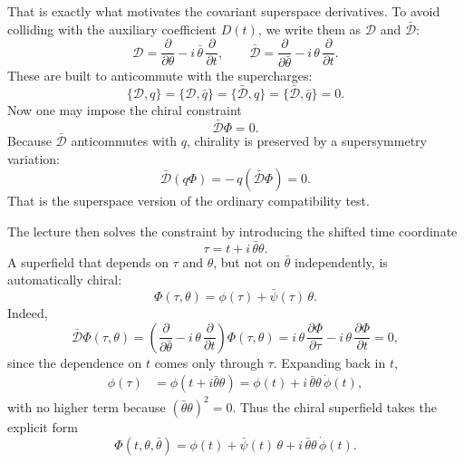 That is exactly what motivates the covariant superspace derivatives. To avoid colliding with the auxiliary coefficient \(D(t)\), we write them as \(\mathcal D\) and \(\bar{\mathcal D}\):
\begin{equation}
\mathcal D=\frac{\partial}{\partial\theta}-i\,\bar\theta\,\frac{\partial}{\partial t},
\qquad
\bar{\mathcal D}=\frac{\partial}{\partial\bar\theta}-i\,\theta\,\frac{\partial}{\partial t}.
\end{equation}
These are built to anticommute with the supercharges:
\begin{equation}
\{\mathcal D,q\}=\{\mathcal D,\bar q\}=\{\bar{\mathcal D},q\}=\{\bar{\mathcal D},\bar q\}=0.
\end{equation}
Now one may impose the chiral constraint
\begin{equation}
\bar{\mathcal D}\Phi=0.
\end{equation}
Because \(\bar{\mathcal D}\) anticommutes with \(q\), chirality is preserved by a supersymmetry variation:
\begin{equation}
\bar{\mathcal D}(q\Phi)=-\,q(\bar{\mathcal D}\Phi)=0.
\end{equation}
That is the superspace version of the ordinary compatibility test.

The lecture then solves the constraint by introducing the shifted time coordinate
\begin{equation}
\tau=t+i\,\bar\theta\theta.
\end{equation}
A superfield that depends on \(\tau\) and \(\theta\), but not on \(\bar\theta\) independently, is automatically chiral:
\begin{equation}
\Phi(\tau,\theta)=\phi(\tau)+\bar\psi(\tau)\,\theta.
\end{equation}
Indeed,
\begin{equation}
\bar{\mathcal D}\Phi(\tau,\theta)
=
\left(\frac{\partial}{\partial\bar\theta}-i\,\theta\,\frac{\partial}{\partial t}\right)\Phi(\tau,\theta)
=
i\,\theta\,\frac{\partial\Phi}{\partial\tau}
-
i\,\theta\,\frac{\partial\Phi}{\partial t}
=0,
\end{equation}
since the dependence on \(t\) comes only through \(\tau\). Expanding back in \(t\),
\begin{align}
\phi(\tau)
&=
\phi\!\left(t+i\bar\theta\theta\right)
=
\phi(t)+i\,\bar\theta\theta\,\dot\phi(t),
\end{align}
with no higher term because \((\bar\theta\theta)^2=0\). Thus the chiral superfield takes the explicit form
\begin{equation}
\Phi(t,\theta,\bar\theta)
=
\phi(t)+\bar\psi(t)\,\theta+i\,\bar\theta\theta\,\dot\phi(t).
\end{equation}

